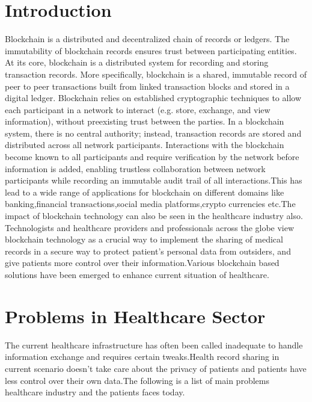 \documentclass[12pt]{report}
\begin{document}
\tableofcontents
{}

\listoffigures


\chapter{Introduction}
\par
Blockchain is a distributed and decentralized chain of records or ledgers.
The immutability of blockchain records ensures trust between participating entities.
At its core, blockchain is a distributed system for recording and storing transaction
records.
More specifically, blockchain is a
shared, immutable record of peer to peer
transactions built from linked transaction
blocks and stored in a digital ledger.
Blockchain relies on established
cryptographic techniques to allow each
participant in a network to interact (e.g.
store, exchange, and view information),
without preexisting trust between the
parties. In a blockchain system, there is no
central authority; instead, transaction
records are stored and distributed across all
network participants. Interactions with the
blockchain become known to all participants
and require verification by the network
before information is added, enabling
trustless collaboration between network
participants while recording an immutable
audit trail of all interactions.This has lead to a wide range of applications for blockchain on different domains like banking,financial transactions,social media platforms,crypto currencies etc.The impact of blockchain technology can also be seen in the healthcare industry also. Technologists and healthcare providers and professionals across the globe view blockchain technology as a crucial way to implement the sharing of medical records in a secure way to protect patient's personal data from outsiders, and give patients more control over their information.Various blockchain based solutions have been emerged to enhance current situation of healthcare.

\chapter{Problems in Healthcare Sector}

The current healthcare infrastructure has often been called inadequate to handle information exchange and requires certain tweaks.Health record sharing in current scenario doesn't take care about the privacy of patients and patients have less control over their own data.The following is a list of main problems healthcare industry and the patients faces today.
\end{document}
